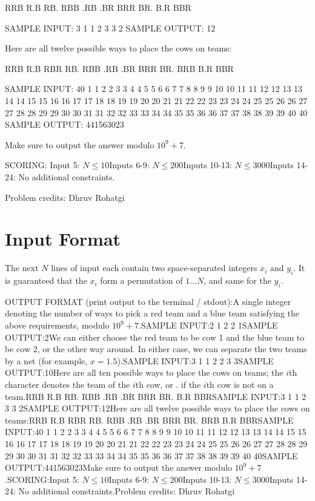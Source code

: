 \documentclass[12pt]{article}
\begin{document}
RRB
R.B
RB.
RBB
.RB
.BR
BRR
BR.
B.R
BBR

SAMPLE INPUT:
3
1 1
2 3
3 2
SAMPLE OUTPUT: 
12

Here are all twelve possible ways to place the cows on teams:


RRB
R.B
RBR
RB.
RBB
.RB
.BR
BRR
BR.
BRB
B.R
BBR

SAMPLE INPUT:
40
1 1
2 2
3 3
4 4
5 5
6 6
7 7
8 8
9 9
10 10
11 11
12 12
13 13
14 14
15 15
16 16
17 17
18 18
19 19
20 20
21 21
22 22
23 23
24 24
25 25
26 26
27 27
28 28
29 29
30 30
31 31
32 32
33 33
34 34
35 35
36 36
37 37
38 38
39 39
40 40
SAMPLE OUTPUT: 
441563023

Make sure to output the answer modulo $10^9+7$.

SCORING:
Input 5: $N\le 10$Inputs 6-9: $N\le 200$Inputs 10-13: $N\le 3000$Inputs 14-24: No additional constraints.


Problem credits: Dhruv Rohatgi



\section*{Input Format}
The next $N$ lines of input each contain two space-separated integers $x_i$ and
$y_i$. It is guaranteed that the $x_i$ form a permutation of $1\dots N$, and
same for the $y_i$.

OUTPUT FORMAT (print output to the terminal / stdout):A single integer denoting the number of ways to pick a red team and a blue team
satisfying the above requirements, modulo $10^9+7$.SAMPLE INPUT:2
1 2
2 1SAMPLE OUTPUT:2We can either choose the red team to be cow 1 and the blue team to be cow 2, or
the other way around. In either case, we can separate the two teams by a net
(for example, $x=1.5$).SAMPLE INPUT:3
1 1
2 2
3 3SAMPLE OUTPUT:10Here are all ten possible ways to place the cows on teams; the $i$th character
denotes the team of the $i$th cow, or . if the $i$th cow is not on a team.RRB
R.B
RB.
RBB
.RB
.BR
BRR
BR.
B.R
BBRSAMPLE INPUT:3
1 1
2 3
3 2SAMPLE OUTPUT:12Here are all twelve possible ways to place the cows on teams:RRB
R.B
RBR
RB.
RBB
.RB
.BR
BRR
BR.
BRB
B.R
BBRSAMPLE INPUT:40
1 1
2 2
3 3
4 4
5 5
6 6
7 7
8 8
9 9
10 10
11 11
12 12
13 13
14 14
15 15
16 16
17 17
18 18
19 19
20 20
21 21
22 22
23 23
24 24
25 25
26 26
27 27
28 28
29 29
30 30
31 31
32 32
33 33
34 34
35 35
36 36
37 37
38 38
39 39
40 40SAMPLE OUTPUT:441563023Make sure to output the answer modulo $10^9+7$.SCORING:Input 5: $N\le 10$Inputs 6-9: $N\le 200$Inputs 10-13: $N\le 3000$Inputs 14-24: No additional constraints.Problem credits: Dhruv Rohatgi
\end{document}

